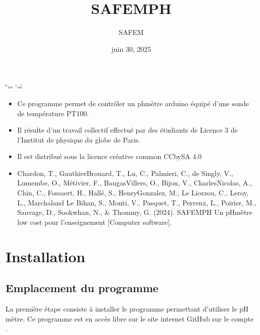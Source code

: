 \documentclass[letterpaper,10pt,french]{sphinxmanual}
\title{SAFE\sphinxhyphen{}M\sphinxhyphen{}PH}
\date{juin 30, 2025}
\author{SAFE\sphinxhyphen{}M}
\begin{document}
\ifdefined\shorthandoff
  \ifnum\catcode`\=\string=\active\shorthandoff{=}\fi
  \ifnum\catcode`\"=\active{}\fi
\fi

\pagestyle{empty}
\sphinxmaketitle
\pagestyle{plain}
\sphinxtableofcontents
\pagestyle{normal}
\label{\detokenize{index::doc}}


\noindent{}
\begin{itemize}
\item {} 
\sphinxAtStartPar
Ce programme permet de contrôler un ph\sphinxhyphen{}mètre arduino équipé d’une sonde de température PT100.

\item {} 
\sphinxAtStartPar
Il résulte d’un travail collectif effectué par des étudiants de Licence 3 de l’Institut de physique du globe de Paris.

\item {} 
\sphinxAtStartPar
Il est distribué sous la licence créative common CC\sphinxhyphen{}by\sphinxhyphen{}SA 4.0

\item {} \begin{description}
\sphinxAtStartPar
Chardon, T., Gauthier\sphinxhyphen{}Brouard, T., Lu, C., Palmieri, C., de Singly, V., Lumembe, O., Métivier, F.,  Baugas\sphinxhyphen{}Villers, O., Bijon, V., Charles\sphinxhyphen{}Nicolas, A., Chin, C., Fossaert, H., Hallé, S., Henry\sphinxhyphen{}Gonzalez, M., Le Liorzou, C., Leroy, L., Marchaland Le Bihan, S., Monti, V., Pasquet, T., Perrenx, L., Poirier, M., Sauvage, D., Sookwhan, N., \& Thommy, G. (2024). SAFE\sphinxhyphen{}M\sphinxhyphen{}PH Un pH\sphinxhyphen{}mètre low cost pour l’enseignement {[}Computer software{]}.

\end{description}

\end{itemize}

\sphinxstepscope


\chapter{Installation}
\label{\detokenize{install:installation}}\label{\detokenize{install::doc}}

\section{Emplacement du programme}
\label{\detokenize{install:emplacement-du-programme}}
\sphinxAtStartPar
La première étape consiste à installer le programme permettant d’utiliser le pH mètre.
Ce programme est en accès libre sur le site internet GitHub sur le compte .
\end{document}

